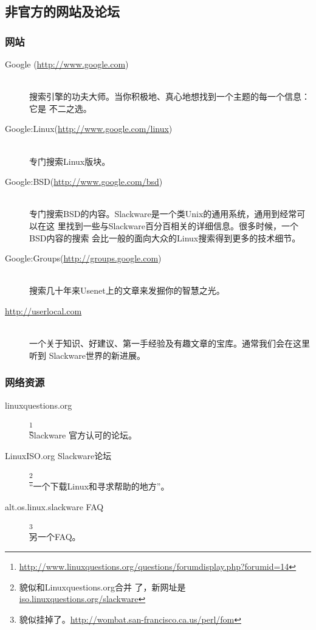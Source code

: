 \subsection{非官方的网站及论坛}
\label{sec:help:onlineHelp:nonOfficial}

\subsubsection{网站}
\label{sec:help:onlineHelp:nonOfficial:websites}

\begin{description}
\item[Google (\url{http://www.google.com})] \hfill \\
搜索引擎的功夫大师。当你积极地、真心地想找到一个主题的每一个信息：它是
不二之选。
\item[Google:Linux(\url{http://www.google.com/linux})] \hfill \\
专门搜索Linux版块。
\item[Google:BSD(\url{http://www.google.com/bsd})] \hfill \\
专门搜索BSD的内容。Slackware是一个类Unix的通用系统，通用到经常可以在这
里找到一些与Slackware百分百相关的详细信息。很多时候，一个BSD内容的搜索
会比一般的面向大众的Linux搜索得到更多的技术细节。
\item[Google:Groups(\url{http://groups.google.com})] \hfill \\
搜索几十年来Usenet上的文章来发掘你的智慧之光。
\item[\url{http://userlocal.com}] \hfill \\
一个关于知识、好建议、第一手经验及有趣文章的宝库。通常我们会在这里听到
Slackware世界的新进展。
\end{description}

\subsubsection{网络资源}
\label{sec:help:onlineHelp:nonOfficial:webbasedResources}

\begin{description}
\item[linuxquestions.org]\footnote{\url{http://www.linuxquestions.org/questions/forumdisplay.php?forumid=14}} \hfill \\
Slackware 官方认可的论坛。
\item[LinuxISO.org Slackware论坛]\footnote{貌似和Linuxquestions.org合并
    了，新网址是\url{iso.linuxquestions.org/slackware}} \hfill \\
``一个下载Linux和寻求帮助的地方''。
\item[alt.os.linux.slackware FAQ]\footnote{貌似挂掉了。\url{http://wombat.san-francisco.ca.us/perl/fom}} \hfill \\
另一个FAQ。
\end{description}

